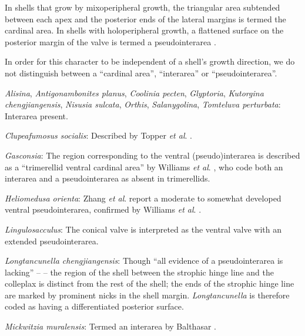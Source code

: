 \documentclass[openany]{book}
\theoremstyle{definition}
\theoremstyle{definition}
\theoremstyle{definition}
\theoremstyle{remark}
\begin{document}
In shells that grow by mixoperipheral growth, the triangular area
subtended between each apex and the posterior ends of the lateral
margins is termed the cardinal area. In shells with holoperipheral
growth, a flattened surface on the posterior margin of the valve is
termed a pseudointerarea
\citep[paraphrasing][]{Williams1997Introduction}.

In order for this character to be independent of a shell's growth
direction, we do not distinguish between a ``cardinal area'',
``interarea'' or ``pseudointerarea''.

\hypertarget{Alisina-coding-101}{}
\emph{Alisina}, \emph{Antigonambonites planus}, \emph{Coolinia pecten},
\emph{Glyptoria}, \emph{Kutorgina chengjiangensis}, \emph{Nisusia
sulcata}, \emph{Orthis}, \emph{Salanygolina}, \emph{Tomteluva
perturbata}: Interarea present.

\hypertarget{Clupeafumosus_socialis-coding-101}{}
\emph{Clupeafumosus socialis}: Described by Topper \emph{et al}.
\citeyearpar{Topper2013Reappraisalof}.

\hypertarget{Gasconsia-coding-101}{}
\emph{Gasconsia}: The region corresponding to the ventral
(pseudo)interarea is described as a ``trimerellid ventral cardinal
area'' by Williams \emph{et al}.
\citeyearpar[p.162]{Williams2000LinguliformeaCraniiformea}, who code
both an interarea and a pseudointerarea as absent in trimerellids.

\hypertarget{Heliomedusa_orienta-coding-101}{}
\emph{Heliomedusa orienta}: Zhang \emph{et al}.
\citeyearpar{Zhang2009Architectureand} report a moderate to somewhat
developed ventral pseudointerarea, confirmed by Williams \emph{et al}.
\citeyearpar{Williams2007Supplement}.

\hypertarget{Lingulosacculus-coding-101}{}
\emph{Lingulosacculus}: The conical valve is interpreted as the ventral
valve with an extended pseudointerarea.

\hypertarget{Longtancunella_chengjiangensis-coding-101}{}
\emph{Longtancunella chengjiangensis}: Though ``all evidence of a
pseudointerarea is lacking'' -- \citet{Zhang2011Theexceptionally} -- the
region of the shell between the strophic hinge line and the colleplax
\citep[fig. 2 in][]{Zhang2011Theexceptionally} is distinct from the rest
of the shell; the ends of the strophic hinge line are marked by
prominent nicks in the shell margin. \emph{Longtancunella} is therefore
coded as having a differentiated posterior surface.

\hypertarget{Mickwitzia_muralensis-coding-101}{}
\emph{Mickwitzia muralensis}: Termed an interarea by Balthasar
\citeyearpar{Balthasar2004Shellstructure}.
\end{document}
